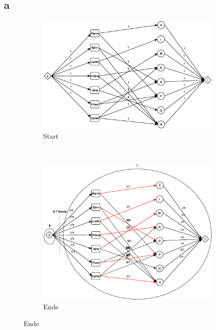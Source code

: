 \documentclass[a4paper,11pt,twoside]{scrartcl}
\begin{document}
\subsection*{a}
\begin{figure}[h]
\centering
\begin{subfigure}[b]{0.45\linewidth}
\includegraphics[width=\linewidth]{img/start}
\caption{Start}
\label{fig:start}
\end{subfigure}
~~
\begin{subfigure}[b]{0.45\linewidth}
\centering
\includegraphics[width=\linewidth]{img/ende}
\caption{Ende}
\label{fig:ende}
\end{subfigure}
\end{figure}
\end{document}

